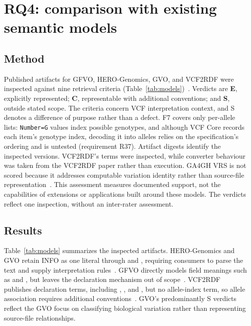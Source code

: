 \section{RQ4: comparison with existing semantic models}
\subsection{Method}
\label{sec:m-rq4}

Published artifacts for GFVO, HERO-Genomics, GVO, and VCF2RDF were inspected against nine retrieval criteria (Table~\ref{tab:models})~\cite{baran2015gfvo,cazzaro2025hero,kawashima2023gvo,penha2017vcf2rdf}.
Verdicts are \textbf{E}, explicitly represented; \textbf{C}, representable with additional conventions; and \textbf{S}, outside stated scope.
The criteria concern VCF interpretation context, and S denotes a difference of purpose rather than a defect.
F7 covers only per-allele lists: \texttt{Number=G} values index possible genotypes, and although VCF Core records each item's genotype index, decoding it into alleles relies on the specification's ordering and is untested (requirement R37).
Artifact digests identify the inspected versions. 
VCF2RDF's terms were inspected, while converter behaviour was taken from the VCF2RDF paper rather than execution.
GA4GH VRS is not scored because it addresses computable variation identity rather than source-file representation~\cite{wagner2021vrs}.
This assessment measures documented support, not the capabilities of extensions or applications built around these models.
The verdicts reflect one inspection, without an inter-rater assessment.

\subsection{Results}
\label{sec:models}

Table~\ref{tab:models} summarizes the inspected artifacts.
HERO-Genomics and GVO retain INFO as one literal through  and , requiring consumers to parse the text and supply interpretation rules~\cite{cazzaro2025hero,kawashima2023gvo}.
GFVO directly models field meanings such as  and , but leaves the declaration mechanism out of scope~\cite{baran2015gfvo}.
VCF2RDF publishes declaration terms, including , , and , but no allele-index term, so allele association requires additional conventions~\cite{penha2017vcf2rdf}.
GVO's predominantly S verdicts reflect the GVO focus on classifying biological variation rather than representing source-file relationships.

